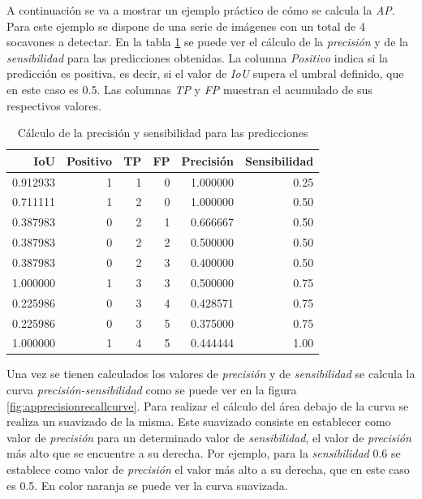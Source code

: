 A continuación se va a mostrar un ejemplo práctico de cómo se calcula la \textit{AP}. Para este ejemplo se dispone de una serie de imágenes con un total de 4 socavones a detectar. En la tabla \ref{tab:apprecisionrecalltable} se puede ver el cálculo de la \textit{precisión} y de la \textit{sensibilidad} para las predicciones obtenidas. La columna \textit{Positivo} indica si la predicción es positiva, es decir, si el valor de \textit{IoU} supera el umbral definido, que en este caso es 0.5. Las columnas \textit{TP} y \textit{FP} muestran el acumulado de sus respectivos valores.

\begin{table}[H]
	\centering
	\begin{tabular}{rrrrrr}
		\toprule
		IoU &  Positivo &  TP &  FP &  Precisión &  Sensibilidad \\
		\midrule
		0.912933 &         1 &   1 &   0 &   1.000000 &          0.25 \\
		0.711111 &         1 &   2 &   0 &   1.000000 &          0.50 \\
		0.387983 &         0 &   2 &   1 &   0.666667 &          0.50 \\
		0.387983 &         0 &   2 &   2 &   0.500000 &          0.50 \\
		0.387983 &         0 &   2 &   3 &   0.400000 &          0.50 \\
		1.000000 &         1 &   3 &   3 &   0.500000 &          0.75 \\
		0.225986 &         0 &   3 &   4 &   0.428571 &          0.75 \\
		0.225986 &         0 &   3 &   5 &   0.375000 &          0.75 \\
		1.000000 &         1 &   4 &   5 &   0.444444 &          1.00 \\
		\bottomrule
	\end{tabular}
	\caption{Cálculo de la precisión y sensibilidad para las predicciones}
	\label{tab:apprecisionrecalltable}
\end{table}

Una vez se tienen calculados los valores de \textit{precisión} y de \textit{sensibilidad} se calcula la curva \textit{precisión-sensibilidad} como se puede ver en la figura \ref{fig:apprecisionrecallcurve}. Para realizar el cálculo del área debajo de la curva se realiza un suavizado de la misma. Este suavizado consiste en establecer como valor de \textit{precisión} para un determinado valor de \textit{sensibilidad}, el valor de \textit{precisión} más alto que se encuentre a su derecha. Por ejemplo, para la \textit{sensibilidad} 0.6 se establece como valor de \textit{precisión} el valor más alto a su derecha, que en este caso es 0.5. En color naranja se puede ver la curva suavizada.

